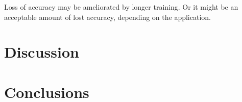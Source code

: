 \documentclass[notitlepage]{article}
\begin{document}
Loss of accuracy may be ameliorated by longer training.
Or it might be an acceptable amount of lost accuracy, depending on the application.

\section{Discussion}

\section{Conclusions}


\end{document}
